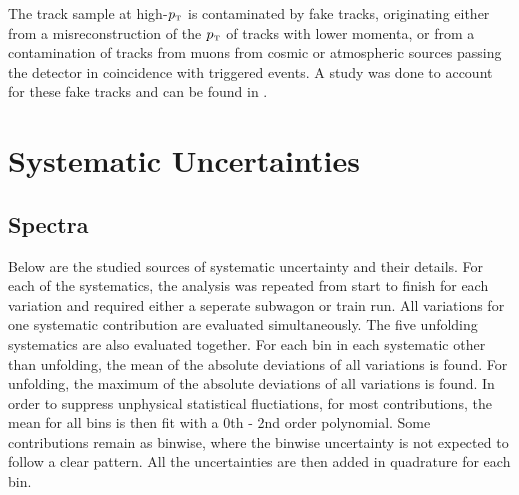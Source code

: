 \documentclass[ALICE]{ALICE_analysis_notes}
\newcommand{\pT}{$p_{\mbox{\tiny T}}$\xspace}
\begin{document}
The track sample at high-\pT is contaminated by fake tracks, originating either from a misreconstruction of the \pT of tracks with lower momenta, or from a contamination of tracks from muons from cosmic or atmospheric sources passing the detector in coincidence with triggered events. A study was done to account for these fake tracks and can be found in \cite{anaNoteMFasel}.\clearpage{}
\clearpage{}\section{Systematic Uncertainties}
\label{chap:Systematics}

\subsection{Spectra}
\label{sec:SystematicsSpectra}

Below are the studied sources of systematic uncertainty and their details. For each of the systematics, the analysis was repeated from start to finish for each variation and required either a seperate subwagon or train run. All variations for one systematic contribution are evaluated simultaneously. The five unfolding systematics are also evaluated together. For each bin in each systematic other than unfolding, the mean of the absolute deviations of all variations is found. For unfolding, the maximum of the absolute deviations of all variations is found. In order to suppress unphysical statistical fluctiations, for most contributions, the mean for all bins is then fit with a 0th - 2nd order polynomial. Some contributions remain as binwise, where the binwise uncertainty is not expected to follow a clear pattern. All the uncertainties are then added in quadrature for each bin.
\end{document}
